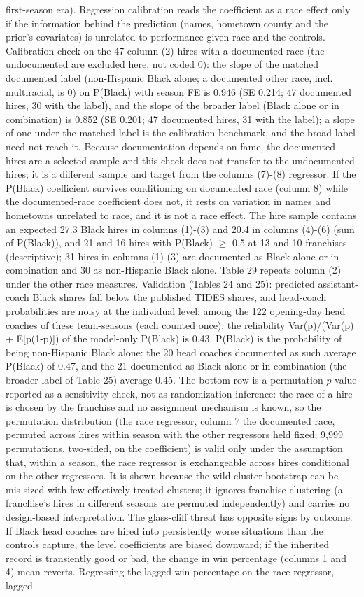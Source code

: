 {first-season era). Regression calibration reads the coefficient as a race effect only if the information behind the prediction (names, hometown county and the prior's covariates) is unrelated to performance given race and the controls. Calibration check on the 47 column-(2) hires with a documented race (the undocumented are excluded here, not coded 0): the slope of the matched documented label (non-Hispanic Black alone; a documented other race, incl. multiracial, is 0) on P(Black) with season FE is 0.946 (SE 0.214; 47 documented hires, 30 with the label), and the slope of the broader label (Black alone or in combination) is 0.852 (SE 0.201; 47 documented hires, 31 with the label); a slope of one under the matched label is the calibration benchmark, and the broad label need not reach it. Because documentation depends on fame, the documented hires are a selected sample and this check does not transfer to the undocumented hires; it is a different sample and target from the columns (7)-(8) regressor. If the P(Black) coefficient survives conditioning on documented race (column 8) while the documented-race coefficient does not, it rests on variation in names and hometowns unrelated to race, and it is not a race effect. The hire sample contains an expected 27.3 Black hires in columns (1)-(3) and 20.4 in columns (4)-(6) (sum of P(Black)), and 21 and 16 hires with P(Black) $\geq$ 0.5 at 13 and 10 franchises (descriptive); 31 hires in columns (1)-(3) are documented as Black alone or in combination and 30 as non-Hispanic Black alone. Table 29 repeats column (2) under the other race measures. Validation (Tables 24 and 25): predicted assistant-coach Black shares fall below the published TIDES shares, and head-coach probabilities are noisy at the individual level: among the 122 opening-day head coaches of these team-seasons (each counted once), the reliability Var(p)/(Var(p) + E[p(1-p)]) of the model-only P(Black) is 0.43. P(Black) is the probability of being non-Hispanic Black alone: the 20 head coaches documented as such average P(Black) of 0.47, and the 21 documented as Black alone or in combination (the broader label of Table 25) average 0.45. The bottom row is a permutation $p$-value reported as a sensitivity check, not as randomization inference: the race of a hire is chosen by the franchise and no assignment mechanism is known, so the permutation distribution (the race regressor, column 7 the documented race, permuted across hires within season with the other regressors held fixed; 9,999 permutations, two-sided, on the coefficient) is valid only under the assumption that, within a season, the race regressor is exchangeable across hires conditional on the other regressors. It is shown because the wild cluster bootstrap can be mis-sized with few effectively treated clusters; it ignores franchise clustering (a franchise's hires in different seasons are permuted independently) and carries no design-based interpretation. The glass-cliff threat has opposite signs by outcome. If Black head coaches are hired into persistently worse situations than the controls capture, the level coefficients are biased downward; if the inherited record is transiently good or bad, the change in win percentage (columns 1 and 4) mean-reverts. Regressing the lagged win percentage on the race regressor, lagged }
